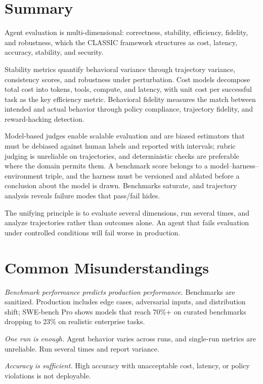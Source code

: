\documentclass[11pt]{book}
\begin{document}
\section{Summary}

Agent evaluation is multi-dimensional: correctness, stability, efficiency, fidelity, and robustness, which the CLASSIC framework structures as cost, latency, accuracy, stability, and security.

Stability metrics quantify behavioral variance through trajectory variance, consistency scores, and robustness under perturbation. Cost models decompose total cost into tokens, tools, compute, and latency, with unit cost per successful task as the key efficiency metric. Behavioral fidelity measures the match between intended and actual behavior through policy compliance, trajectory fidelity, and reward-hacking detection.

Model-based judges enable scalable evaluation and are biased estimators that must be debiased against human labels and reported with intervals; rubric judging is unreliable on trajectories, and deterministic checks are preferable where the domain permits them. A benchmark score belongs to a model--harness--environment triple, and the harness must be versioned and ablated before a conclusion about the model is drawn. Benchmarks saturate, and trajectory analysis reveals failure modes that pass/fail hides.

The unifying principle is to evaluate several dimensions, run several times, and analyze trajectories rather than outcomes alone. An agent that fails evaluation under controlled conditions will fail worse in production.

\section{Common Misunderstandings}

\textit{Benchmark performance predicts production performance.} Benchmarks are sanitized. Production includes edge cases, adversarial inputs, and distribution shift; SWE-bench Pro shows models that reach 70\%+ on curated benchmarks dropping to 23\% on realistic enterprise tasks.

\textit{One run is enough.} Agent behavior varies across runs, and single-run metrics are unreliable. Run several times and report variance.

\textit{Accuracy is sufficient.} High accuracy with unacceptable cost, latency, or policy violations is not deployable.
\end{document}
